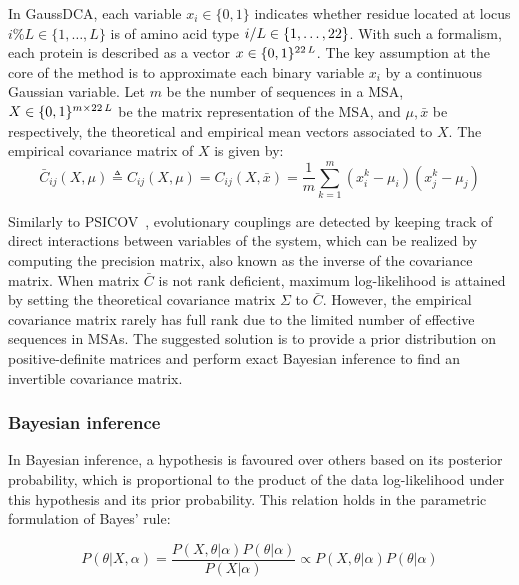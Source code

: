         In GaussDCA, each variable $x_i \in \{0, 1\}$ indicates whether residue located at locus $i \% L \in \{ 1, \dotsc, L \}$
        is of amino acid type $i / L \in \{1, \dotsc, 22\}$. With such a formalism, each protein is described as a vector
        $x \in \{0, 1\}^{22\,L}$. The key assumption at the core of the method is to approximate each binary variable $x_i$
        by a continuous Gaussian variable. Let $m$ be the number of sequences in a MSA, $X \in \{0, 1\}^{m \times 22\,L}$
        be the matrix representation of the MSA, and $\mu, \bar{x}$ be respectively, the theoretical and empirical mean vectors associated to $X$.
        The empirical covariance matrix of $X$ is given by:  %
        \begin{equation}
            \bar{C}_{ij}(X, \mu) \triangleq C_{ij}(X, \mu) = C_{ij}(X, \bar{x}) = \frac{1}{m} \sum\limits_{k=1}^m (x_i^k - \mu_i) (x_j^k - \mu_j)
        \end{equation}

        Similarly to PSICOV~\cite{doi:10.1093/bioinformatics/btr638}, evolutionary couplings are detected by keeping track of direct interactions
        between variables of the system, which can be realized by computing the precision matrix, also known as the inverse of the covariance matrix.
        When matrix $\bar{C}$ is not rank deficient, maximum log-likelihood is attained by setting the theoretical covariance matrix
        $\Sigma$ to $\bar{C}$. However, the empirical covariance matrix rarely has full rank due to the limited number of effective sequences
        in MSAs. The suggested solution is to provide a prior distribution on positive-definite matrices and perform exact Bayesian inference
        to find an invertible covariance matrix.

        \subsubsection{Bayesian inference}

            In Bayesian inference, a hypothesis is favoured over others based on its posterior probability,
            which is proportional to the product of the data log-likelihood under this hypothesis
            and its prior probability. This relation holds in the parametric formulation of Bayes' rule:

            \begin{equation}
                P(\theta \vert X, \alpha) = \frac{P(X, \theta \vert \alpha) P(\theta \vert \alpha)}{P(X \vert \alpha)} \propto
                P(X, \theta \vert \alpha) P(\theta \vert \alpha)
            \end{equation}

